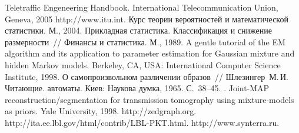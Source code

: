 \begin{multicols}{2}
{\small\frenchspacing
{%
\begin{thebibliography}{9}
Teletraffic Engeneering Handbook. International Telecommunication Union, 
Geneva, 2005 {\sf http://www.itu.int}. \vspace*{5pt} 
 Курс теории вероятностей и математической статистики. 
М., 2004. \vspace*{5pt} 
 Прикладная 
статистика. Классификация и снижение размерности~// Финансы и статистика. М., 
1989. \vspace*{5pt} 
 A gentle tutorial of the EM algorithm and its application to 
parameter estimation for Gaussian mixture and hidden Markov models. Berkeley, 
CA, USA: International Computer Science Institute,  1998. \vspace*{5pt} 
 О самопроизвольном различении образов~// Шлезингер~М.\,И. 
Читающие. автоматы. Киев: Наукова думка, 1965. С.~38--45. \vspace*{5pt} 
. Joint-MAP 
reconstruction/segmentation for transmission tomography using mixture-models as 
priors. Yale University, 1998. \vspace*{5pt} 
{\sf http://zedgraph.org}. \vspace*{4pt} 
{\sf http://ita.ee.lbl.gov/html/contrib/LBL-PKT.html}. \vspace*{5pt} 
{\sf http://www.synterra.ru}.
\end{thebibliography}

} } \label{end\stat}
\end{multicols}